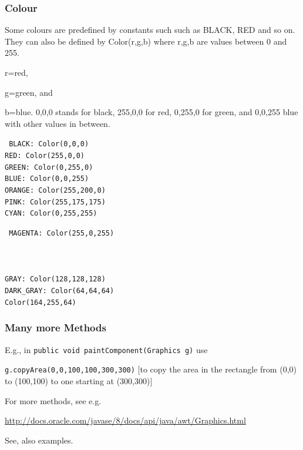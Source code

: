 \documentclass{beamer}
\def\mcolor#1#2{\rule{0ex}{0ex}\color{#1}#2\color{black}{}}
\begin{document}
\begin{frame}[fragile]
\frametitle{Colour}
Some colours are predefined by
 constants such such as BLACK, RED and so on. They can also be
 defined by Color(r,g,b) where r,g,b are values between 0 and
 255. \mcolor{red}{r=red}, \mcolor{green}{g=green}, and \mcolor{blue}{b=blue}. 0,0,0 stands for black, 255,0,0
 for red, 0,255,0 for green, and 0,0,255 blue with other values in
 between.\bigskip

\begin{minipage}{0.43\textwidth}\small
\tt
        {\color[rgb]{0,0,0}BLACK: Color(0,0,0)}\\
	{\color[rgb]{1,0,0}RED: Color(255,0,0)}\\
	{\color[rgb]{0,1,0}GREEN: Color(0,255,0)}\\
	{\color[rgb]{0,0,1}BLUE: Color(0,0,255)}\\
	{\color[rgb]{1,0.784,0}ORANGE: Color(255,200,0)}\\
	{\color[rgb]{1,0.683,0.683}PINK: Color(255,175,175)}\\
	{\color[rgb]{0,1,1}CYAN: Color(0,255,255)}
\end{minipage}\quad
\begin{minipage}{0.53\textwidth}\small
\tt
	{\color[rgb]{1,0,1}MAGENTA: Color(255,0,255)}\\
	{\color[rgb]{0,0,0}{\rule[-0.5ex]{\textwidth}{3ex}}\hspace*{-\textwidth}\color[rgb]{1,1,0}{YELLOW: Color(255,255,0)}}\\
	{\color[rgb]{0,0,0}{\rule[-0.5ex]{\textwidth}{3ex}}\hspace*{-\textwidth}\color[rgb]{1,1,1}{WHITE: Color(255,255,255)}}\\
	{\color[rgb]{0,0,0}{\rule[-0.5ex]{\textwidth}{3ex}}\hspace*{-\textwidth}\color[rgb]{0.75,0.75,0.75}{LIGHT\_GRAY: Color(192,192,192)}}\\
	{\color[rgb]{0.5,0.5,0.5}GRAY: Color(128,128,128)}\\
	{\color[rgb]{0.25,0.25,0.25}DARK\_GRAY: Color(64,64,64)}\\
	{\color[rgb]{0.643,1,0.25}Color(164,255,64)}
\end{minipage}
\end{frame}

\begin{frame}
\frametitle{Many more Methods}

E.g., in \texttt{public void paintComponent(Graphics g)} use\\
\mcolor{blue}{\texttt{g.copyArea(0,0,100,100,300,300)}} [to copy the area in the rectangle from (0,0) to (100,100) to one starting at (300,300)]\bigskip\bigskip

For more methods, see e.g.\\
\mcolor{blue}{\url{http://docs.oracle.com/javase/8/docs/api/java/awt/Graphics.html}}

See, also examples.

\end{frame}
\end{document}
